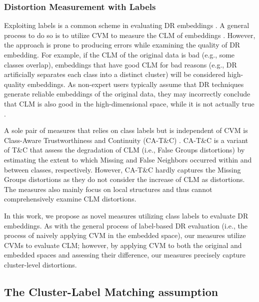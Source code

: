 \subsubsection{Distortion Measurement with Labels}

\label{sec:dislabel}

Exploiting labels is a common scheme in evaluating DR embeddings \cite{colange20neurips, joia11lamp, loch15neurocomputing, xia22tvcg, becht19nature, xiang21fig, yang21cellreports}.
A general process to do so is to utilize CVM to measure the CLM of embeddings \cite{joia11lamp, loch15neurocomputing, becht19nature, yang21cellreports}.
However, the approach is prone to producing errors while examining the quality of DR embedding.
For example, if the CLM of the original data is bad (e.g., some classes overlap), embeddings that have good CLM for bad reasons (e.g., DR artificially separates each class into a distinct cluster) will be considered high-quality embeddings. 
As non-expert users typically assume that DR techniques generate reliable embeddings of the original data, they may incorrectly conclude that CLM is also good in the high-dimensional space, while it is not actually true \cite{jeon22arxiv2, aupetit14beliv}.

A sole pair of measures that relies on class labels but is independent of CVM is Class-Aware Trustworthiness and Continuity (CA-T\&C) \cite{colange20neurips}.
CA-T\&C is a variant of T\&C that assess the degradation of CLM (i.e., False Groups distortions) by estimating 
the extent to which Missing and False Neighbors occurred within and between classes, respectively. 
However, CA-T\&C hardly captures the Missing Groups distortions as they do not consider the increase of CLM as distortions. 
The measures also mainly focus on local structures and thus cannot comprehensively examine CLM distortions.


In this work, we propose \ltc as novel measures utilizing class labels to evaluate  DR embeddings. 
As with the general process of label-based DR evaluation (i.e., the process of naively applying CVM in the embedded space), our measures utilize CVMs to evaluate CLM; however, by applying CVM to both the original and embedded spaces and assessing their difference, our measures precisely capture cluster-level distortions.



\subsection{The Cluster-Label Matching assumption}



